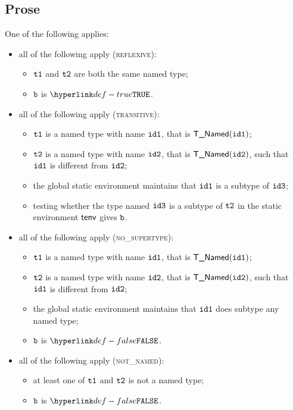 \documentclass{book}
\begin{document}
\subsection{Prose}
One of the following applies:
\begin{itemize}
  \item all of the following apply (\textsc{reflexive}):
  \begin{itemize}
    \item $\texttt{t1}$ and $\texttt{t2}$ are both the same named type;
    \item $\texttt{b}$ is $\True$.
  \end{itemize}

  \item all of the following apply (\textsc{transitive}):
  \begin{itemize}
    \item $\texttt{t1}$ is a named type with name $\texttt{id1}$, that is $\textsf{T\_Named}(\texttt{id1})$;
    \item $\texttt{t2}$ is a named type with name $\texttt{id2}$, that is $\textsf{T\_Named}(\texttt{id2})$, such that $\texttt{id1}$ is different from $\texttt{id2}$;
    \item the global static environment maintains that $\texttt{id1}$ is a subtype of $\texttt{id3}$;
    \item testing whether the type named $\texttt{id3}$ is a subtype of $\texttt{t2}$ in the static environment $\textsf{tenv}$
    gives $\texttt{b}$.
  \end{itemize}

  \item all of the following apply (\textsc{no\_supertype}):
  \begin{itemize}
    \item $\texttt{t1}$ is a named type with name $\texttt{id1}$, that is $\textsf{T\_Named}(\texttt{id1})$;
    \item $\texttt{t2}$ is a named type with name $\texttt{id2}$, that is $\textsf{T\_Named}(\texttt{id2})$, such that $\texttt{id1}$ is different from $\texttt{id2}$;
    \item the global static environment maintains that $\texttt{id1}$ does subtype any named type;
    \item $\texttt{b}$ is $\False$.
  \end{itemize}

  \item all of the following apply (\textsc{not\_named}):
  \begin{itemize}
    \item at least one of $\texttt{t1}$ and $\texttt{t2}$ is not a named type;
    \item $\texttt{b}$ is $\False$.
  \end{itemize}
\end{itemize}
\end{document}
